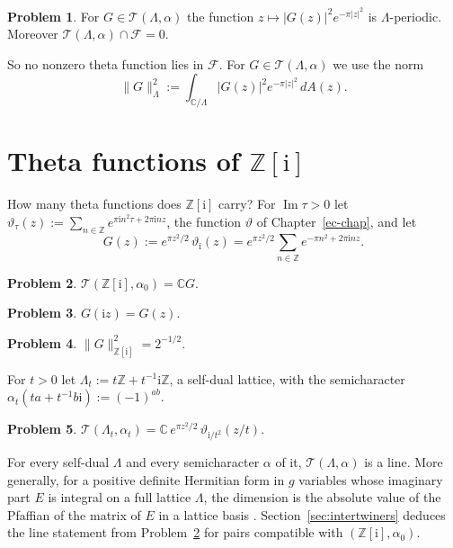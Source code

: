 \documentclass[reqno]{amsart}
\newcounter{chap}
\theoremstyle{definition}
\newtheorem{problem}{Problem}[section]
\theoremstyle{plain}
\newcommand{\Z}{\mathbb{Z}}
\newcommand{\C}{\mathbb{C}}
\newcommand{\ii}{\mathrm{i}}
\newcommand{\Fc}{\mathcal{F}}
\begin{document}
\begin{problem}\label{pr:not-fock}
For \(G \in \mathcal{T}(\Lambda,\alpha)\) the function \(z \mapsto \lvert G(z)\rvert^2 e^{-\pi\lvert z\rvert^2}\) is \(\Lambda\)-periodic.  Moreover \(\mathcal{T}(\Lambda,\alpha) \cap \Fc = 0\).
\end{problem}

So no nonzero theta function lies in \(\Fc\).  For \(G \in \mathcal{T}(\Lambda,\alpha)\) we use the norm
\[
  \lVert G\rVert_\Lambda^2 := \int_{\C/\Lambda} \lvert G(z)\rvert^2 e^{-\pi\lvert z\rvert^2}\, dA(z) .
\]

\section{Theta functions of \texorpdfstring{\(\Z[\ii]\)}{Z[i]}}\label{sec:gauss}

How many theta functions does \(\Z[\ii]\) carry?  For \(\operatorname{Im}\tau > 0\) let \(\vartheta_\tau(z) := \sum_{n \in \Z} e^{\pi\ii n^2\tau + 2\pi\ii n z}\), the function \(\vartheta\) of Chapter~\ref{ec-chap}, and let
\[
  G(z) := e^{\pi z^2/2}\, \vartheta_\ii(z) = e^{\pi z^2/2} \sum_{n \in \Z} e^{-\pi n^2 + 2\pi\ii n z} .
\]

\begin{problem}\label{pr:G-line}
\(\mathcal{T}(\Z[\ii], \alpha_0) = \C G\).
\end{problem}

\begin{problem}\label{pr:G-rot}
\(G(\ii z) = G(z)\).
\end{problem}

\begin{problem}\label{pr:G-norm}
\(\lVert G\rVert_{\Z[\ii]}^2 = 2^{-1/2}\).
\end{problem}

For \(t > 0\) let \(\Lambda_t := t\Z + t^{-1}\ii\Z\), a self-dual lattice, with the semicharacter \(\alpha_t(ta + t^{-1}b\ii) := (-1)^{ab}\).

\begin{problem}\label{pr:diag}
\(\mathcal{T}(\Lambda_t, \alpha_t) = \C\, e^{\pi z^2/2}\, \vartheta_{\ii/t^2}(z/t)\).
\end{problem}

For every self-dual \(\Lambda\) and every semicharacter \(\alpha\) of it, \(\mathcal{T}(\Lambda,\alpha)\) is a line.  More generally, for a positive definite Hermitian form in \(g\) variables whose imaginary part \(E\) is integral on a full lattice \(\Lambda\), the dimension is the absolute value of the Pfaffian of the matrix of \(E\) in a lattice basis \cite[Ch.~3]{Pol}.  Section~\ref{sec:intertwiners} deduces the line statement from Problem~\ref{pr:G-line} for pairs compatible with \((\Z[\ii],\alpha_0)\).
\end{document}
